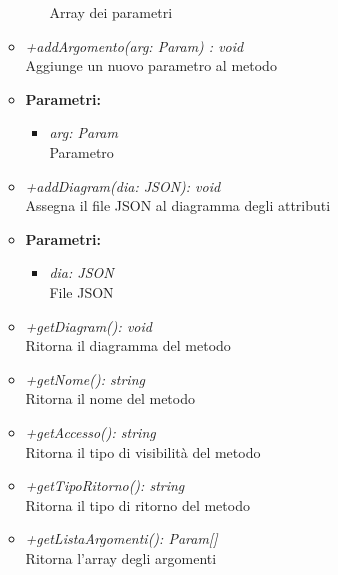 \begin{itemize}
\begin{itemize}
\begin{itemize}
            					Array dei parametri
            				\end{itemize}         				
          				\item \emph{+addArgomento(arg: Param) : void}\\
          				Aggiunge un nuovo parametro al metodo
          				\item \textbf{Parametri:}\\
            				\begin{itemize}
            					\item \emph{arg: Param}\\
            					Parametro
            				\end{itemize}          				
          				\item \emph{+addDiagram(dia: JSON): void}\\
          				Assegna il file JSON al diagramma degli attributi
          				\item \textbf{Parametri:}\\
            				\begin{itemize}
            					\item \emph{dia: JSON}\\
            					File JSON
            				\end{itemize}          				
          				\item \emph{+getDiagram(): void}\\
          				Ritorna il diagramma del metodo          				
          				\item \emph{+getNome(): string}\\
          				Ritorna il nome del metodo
          				\item \emph{+getAccesso(): string}\\
          				Ritorna il tipo di visibilità del metodo          				
          				\item \emph{+getTipoRitorno(): string}\\
          				Ritorna il tipo di ritorno del metodo          				
          				\item \emph{+getListaArgomenti(): Param[]}\\
          				Ritorna l'array degli argomenti          				
            		\end{itemize}
          		\end{itemize}
